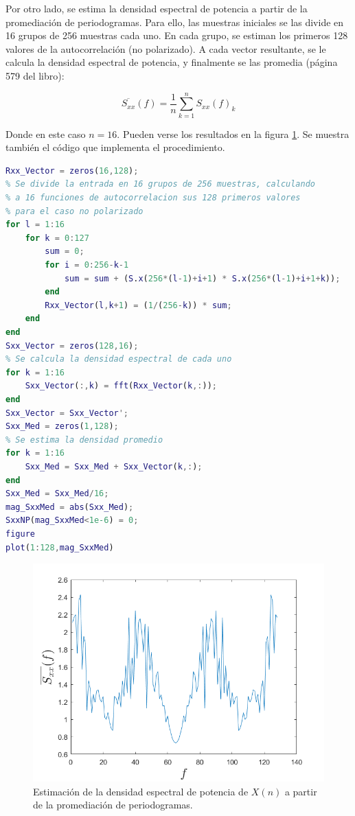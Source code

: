 Por otro lado, se estima la densidad espectral de potencia a partir de la promediaci\'on de periodogramas. Para ello, las muestras iniciales se las divide en 16 grupos de 256 muestras cada uno. En cada grupo, se estiman los primeros 128 valores de la autocorrelación (no polarizado). A cada vector resultante, se le calcula la densidad espectral de potencia, y finalmente se las promedia (página 579 del libro): 

\[
\overline{S_{xx}}(f) = \frac{1}{n} \sum_{k=1}^n S_{xx}(f)_k
\]

Donde en este caso $n=16$. Pueden verse los resultados en la figura \ref{perio}. Se muestra también el código que implementa el procedimiento.

\begin{lstlisting}[language=Matlab, caption=EJ1.m]
% Por periodogramas
Rxx_Vector = zeros(16,128);
% Se divide la entrada en 16 grupos de 256 muestras, calculando
% a 16 funciones de autocorrelacion sus 128 primeros valores
% para el caso no polarizado
for l = 1:16
    for k = 0:127
        sum = 0;
        for i = 0:256-k-1
            sum = sum + (S.x(256*(l-1)+i+1) * S.x(256*(l-1)+i+1+k));
        end
        Rxx_Vector(l,k+1) = (1/(256-k)) * sum;
    end
end
Sxx_Vector = zeros(128,16);
% Se calcula la densidad espectral de cada uno
for k = 1:16
    Sxx_Vector(:,k) = fft(Rxx_Vector(k,:));
end
Sxx_Vector = Sxx_Vector';
Sxx_Med = zeros(1,128);
% Se estima la densidad promedio
for k = 1:16
    Sxx_Med = Sxx_Med + Sxx_Vector(k,:);
end
Sxx_Med = Sxx_Med/16;
mag_SxxMed = abs(Sxx_Med);
SxxNP(mag_SxxMed<1e-6) = 0;
figure
plot(1:128,mag_SxxMed)
\end{lstlisting}


\begin{figure}[H] %
\centering
\includegraphics[scale=0.45]{../EJ1/periodogramaNP}
\caption{Estimaci\'on de la densidad espectral de potencia de $X(n)$ a partir de la promediaci\'on de periodogramas.}
\label{perio}
\end{figure}

